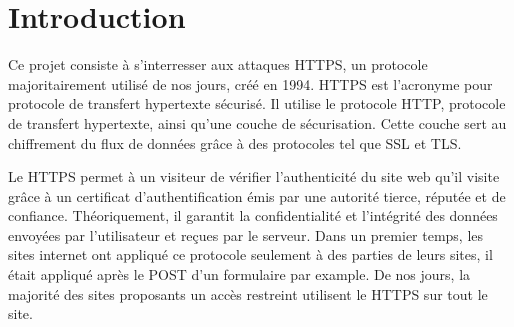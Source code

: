 \chapter*{Introduction}

Ce projet consiste à s'interresser aux attaques HTTPS, un protocole majoritairement utilisé de nos jours, créé en 1994. HTTPS est l'acronyme pour protocole de transfert hypertexte sécurisé. Il utilise le protocole HTTP, protocole de transfert hypertexte, ainsi qu'une couche de sécurisation. Cette couche sert au chiffrement du flux de données grâce à des protocoles tel que SSL et TLS.

Le HTTPS permet à un visiteur de vérifier l'authenticité du site web qu'il visite grâce à un certificat d'authentification émis par une autorité tierce, réputée et de confiance. Théoriquement, il garantit la confidentialité et l'intégrité des données envoyées par l'utilisateur et reçues par le serveur. Dans un premier temps, les sites internet ont appliqué ce protocole seulement à des parties de leurs sites, il était appliqué après le POST d'un formulaire par example. De nos jours, la majorité des sites proposants un accès restreint utilisent le HTTPS sur tout le site.







